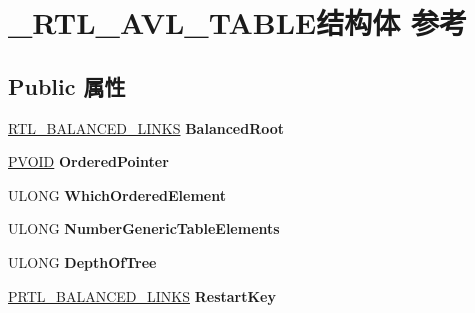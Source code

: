\hypertarget{struct___r_t_l___a_v_l___t_a_b_l_e}{}\section{\+\_\+\+R\+T\+L\+\_\+\+A\+V\+L\+\_\+\+T\+A\+B\+L\+E结构体 参考}
\label{struct___r_t_l___a_v_l___t_a_b_l_e}
\subsection*{Public 属性}
\begin{DoxyCompactItemize}
\item 
\mbox{\label{struct___r_t_l___a_v_l___t_a_b_l_e_a42e9c32f48f32e3d83b79aac6b0cd9d9}} 
\hyperlink{struct___r_t_l___b_a_l_a_n_c_e_d___l_i_n_k_s}{R\+T\+L\+\_\+\+B\+A\+L\+A\+N\+C\+E\+D\+\_\+\+L\+I\+N\+KS} {\bfseries Balanced\+Root}
\item 
\mbox{\label{struct___r_t_l___a_v_l___t_a_b_l_e_a9d2776b428e5b9ab52843cc93fa0934b}} 
\hyperlink{interfacevoid}{P\+V\+O\+ID} {\bfseries Ordered\+Pointer}
\item 
\mbox{\label{struct___r_t_l___a_v_l___t_a_b_l_e_a7015dba7f5cdaa74d9bba269531adf3d}} 
U\+L\+O\+NG {\bfseries Which\+Ordered\+Element}
\item 
\mbox{\label{struct___r_t_l___a_v_l___t_a_b_l_e_a428c9d15f1fd515bf3572da842208744}} 
U\+L\+O\+NG {\bfseries Number\+Generic\+Table\+Elements}
\item 
\mbox{\label{struct___r_t_l___a_v_l___t_a_b_l_e_a34d2480d07c04993b8ac797a529bb872}} 
U\+L\+O\+NG {\bfseries Depth\+Of\+Tree}
\item 
\mbox{\label{struct___r_t_l___a_v_l___t_a_b_l_e_af73c7fc4c08a89581f3df3c2890b0482}} 
\hyperlink{struct___r_t_l___b_a_l_a_n_c_e_d___l_i_n_k_s}{P\+R\+T\+L\+\_\+\+B\+A\+L\+A\+N\+C\+E\+D\+\_\+\+L\+I\+N\+KS} {\bfseries Restart\+Key}
\item 
\mbox{\label{struct___r_t_l___a_v_l___t_a_b_l_e_a2381bcd09f5e6b8d86655f047d47a859}} 

\end{DoxyCompactItemize}
